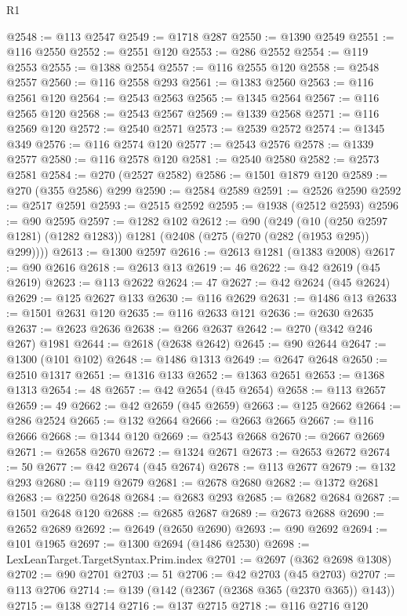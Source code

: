 \begin{lexlean}{R1}
\begin{coremodule}
@2548 := @113 @2547
@2549 := @1718 @287
@2550 := @1390 @2549
@2551 := @116 @2550
@2552 := @2551 @120
@2553 := @286 @2552
@2554 := @119 @2553
@2555 := @1388 @2554
@2557 := @116 @2555 @120
@2558 := @2548 @2557
@2560 := @116 @2558 @293
@2561 := @1383 @2560
@2563 := @116 @2561 @120
@2564 := @2543 @2563
@2565 := @1345 @2564
@2567 := @116 @2565 @120
@2568 := @2543 @2567
@2569 := @1339 @2568
@2571 := @116 @2569 @120
@2572 := @2540 @2571
@2573 := @2539 @2572
@2574 := @1345 @349
@2576 := @116 @2574 @120
@2577 := @2543 @2576
@2578 := @1339 @2577
@2580 := @116 @2578 @120
@2581 := @2540 @2580
@2582 := @2573 @2581
@2584 := @270 (@2527 @2582)
@2586 := @1501 @1879 @120
@2589 := @270 (@355 @2586) @299
@2590 := @2584 @2589
@2591 := @2526 @2590
@2592 := @2517 @2591
@2593 := @2515 @2592
@2595 := @1938 (@2512 @2593)
@2596 := @90 @2595
@2597 := @1282 @102
@2612 := @90
    (@249
      (@10 (@250 @2597 @1281) (@1282 @1283))
      @1281
      (@2408 (@275 (@270 (@282 (@1953 @295)) @299))))
@2613 := @1300 @2597
@2616 := @2613 @1281 (@1383 @2008)
@2617 := @90 @2616
@2618 := @2613 @13
@2619 := 46
@2622 := @42 @2619 (@45 @2619)
@2623 := @113 @2622
@2624 := 47
@2627 := @42 @2624 (@45 @2624)
@2629 := @125 @2627 @133
@2630 := @116 @2629
@2631 := @1486 @13
@2633 := @1501 @2631 @120
@2635 := @116 @2633 @121
@2636 := @2630 @2635
@2637 := @2623 @2636
@2638 := @266 @2637
@2642 := @270 (@342 @246 @267) @1981
@2644 := @2618 (@2638 @2642)
@2645 := @90 @2644
@2647 := @1300 (@101 @102)
@2648 := @1486 @1313
@2649 := @2647 @2648
@2650 := @2510 @1317
@2651 := @1316 @133
@2652 := @1363 @2651
@2653 := @1368 @1313
@2654 := 48
@2657 := @42 @2654 (@45 @2654)
@2658 := @113 @2657
@2659 := 49
@2662 := @42 @2659 (@45 @2659)
@2663 := @125 @2662
@2664 := @286 @2524
@2665 := @132 @2664
@2666 := @2663 @2665
@2667 := @116 @2666
@2668 := @1344 @120
@2669 := @2543 @2668
@2670 := @2667 @2669
@2671 := @2658 @2670
@2672 := @1324 @2671
@2673 := @2653 @2672
@2674 := 50
@2677 := @42 @2674 (@45 @2674)
@2678 := @113 @2677
@2679 := @132 @293
@2680 := @119 @2679
@2681 := @2678 @2680
@2682 := @1372 @2681
@2683 := @2250 @2648
@2684 := @2683 @293
@2685 := @2682 @2684
@2687 := @1501 @2648 @120
@2688 := @2685 @2687
@2689 := @2673 @2688
@2690 := @2652 @2689
@2692 := @2649 (@2650 @2690)
@2693 := @90 @2692
@2694 := @101 @1965
@2697 := @1300 @2694 (@1486 @2530)
@2698 := LexLeanTarget.TargetSyntax.Prim.index
@2701 := @2697 (@362 @2698 @1308)
@2702 := @90 @2701
@2703 := 51
@2706 := @42 @2703 (@45 @2703)
@2707 := @113 @2706
@2714 := @139 (@142 (@2367 (@2368 @365 (@2370 @365)) @143))
@2715 := @138 @2714
@2716 := @137 @2715
@2718 := @116 @2716 @120

\end{coremodule}
\end{lexlean}
